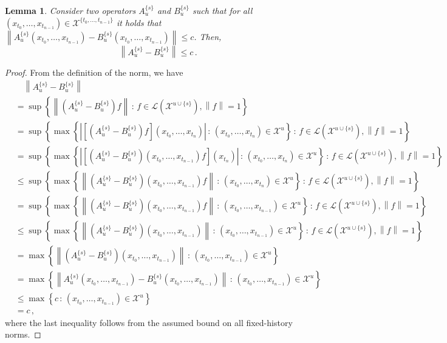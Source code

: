 \documentclass[10pt]{paper}
\newtheorem{lemma}[theorem]{Lemma}
\newcommand{\states}{\mathcal{X}}
\newcommand{\gambles}{\mathcal{L}}
\newcommand{\norm}[1]{\left\lVert #1 \right\rVert}
\begin{document}
\begin{lemma}\label{lemma:nonmarkov_fixedhistory_bound_to_global_bound}
Consider two operators $A_u^{\{s\}}$ and $B_u^{\{s\}}$ such that for all $(x_{t_0},\ldots,x_{t_{n-1}})\in\states^{\{t_0,\ldots,t_{n-1}\}}$ it holds that $\norm{A_u^{\{s\}}(x_{t_0},\ldots,x_{t_{n-1}}) - B_u^{\{s\}}(x_{t_0},\ldots,x_{t_{n-1}})} \leq c$. Then,
\begin{equation*}
\norm{A_u^{\{s\}} - B_u^{\{s\}}} \leq c\,.
\end{equation*}
\end{lemma}
\begin{proof}
From the definition of the norm, we have
\begin{align*}
&\quad\norm{A_u^{\{s\}} - B_u^{\{s\}}} \\
&= \sup\left\{\norm{\left(A_u^{\{s\}} - B_u^{\{s\}}\right)f}\,:\,f\in\gambles(\states^{u\cup\{s\}}),\norm{f}=1\right\} \\
&= \sup\left\{\max\left\{\left\vert \left[\left(A_u^{\{s\}} - B_u^{\{s\}}\right)f\right](x_{t_0},\ldots,x_{t_n}) \right\vert\,:\,(x_{t_0},\ldots,x_{t_n})\in\states^u\right\}\,:\,f\in\gambles(\states^{u\cup\{s\}}),\norm{f}=1\right\} \\
&= \sup\left\{\max\left\{\left\vert \left[\left(A_u^{\{s\}} - B_u^{\{s\}}\right)(x_{t_0},\ldots,x_{t_{n-1}})f\right](x_{t_n}) \right\vert\,:\,(x_{t_0},\ldots,x_{t_n})\in\states^u\right\}\,:\,f\in\gambles(\states^{u\cup\{s\}}),\norm{f}=1\right\} \\
&\leq \sup\left\{\max\left\{\norm{ \left(A_u^{\{s\}} - B_u^{\{s\}}\right)(x_{t_0},\ldots,x_{t_{n-1}})f} \,:\,(x_{t_0},\ldots,x_{t_n})\in\states^u\right\}\,:\,f\in\gambles(\states^{u\cup\{s\}}),\norm{f}=1\right\} \\
&= \sup\left\{\max\left\{\norm{ \left(A_u^{\{s\}} - B_u^{\{s\}}\right)(x_{t_0},\ldots,x_{t_{n-1}})f} \,:\,(x_{t_0},\ldots,x_{t_{n-1}})\in\states^u\right\}\,:\,f\in\gambles(\states^{u\cup\{s\}}),\norm{f}=1\right\} \\
&\leq \sup\left\{\max\left\{\norm{ \left(A_u^{\{s\}} - B_u^{\{s\}}\right)(x_{t_0},\ldots,x_{t_{n-1}})} \,:\,(x_{t_0},\ldots,x_{t_{n-1}})\in\states^u\right\}\,:\,f\in\gambles(\states^{u\cup\{s\}}),\norm{f}=1\right\} \\
&= \max\left\{\norm{ \left(A_u^{\{s\}} - B_u^{\{s\}}\right)(x_{t_0},\ldots,x_{t_{n-1}})} \,:\,(x_{t_0},\ldots,x_{t_{n-1}})\in\states^u\right\} \\
&= \max\left\{\norm{ A_u^{\{s\}}(x_{t_0},\ldots,x_{t_{n-1}}) - B_u^{\{s\}}(x_{t_0},\ldots,x_{t_{n-1}})} \,:\,(x_{t_0},\ldots,x_{t_{n-1}})\in\states^u\right\} \\
&\leq \max\left\{c \,:\,(x_{t_0},\ldots,x_{t_{n-1}})\in\states^u\right\} \\
&= c\,,
\end{align*}
where the last inequality follows from the assumed bound on all fixed-history norms.
\end{proof}
\end{document}
